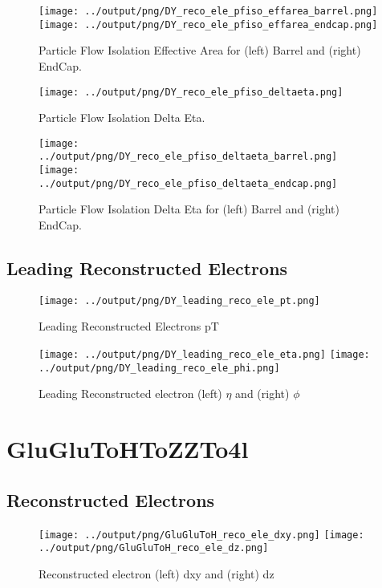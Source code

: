 \documentclass[11pt]{book}
\begin{document}
\begin{figure}[ht]
\centering
\texttt{[image: ../output/png/DY\_reco\_ele\_pfiso\_effarea\_barrel.png]}
\texttt{[image: ../output/png/DY\_reco\_ele\_pfiso\_effarea\_endcap.png]}
\caption{Particle Flow Isolation Effective Area for (left) Barrel and (right) EndCap.}
\label{fig:dy_reco_ele_pfiso_effarea_regions}
\end{figure}


\begin{figure}[ht]
\centering
\texttt{[image: ../output/png/DY\_reco\_ele\_pfiso\_deltaeta.png]}
\caption{Particle Flow Isolation Delta Eta.}
\label{fig:dy_reco_ele_pfiso_deltaeta}
\end{figure}

\begin{figure}[ht]
\centering
\texttt{[image: ../output/png/DY\_reco\_ele\_pfiso\_deltaeta\_barrel.png]}
\texttt{[image: ../output/png/DY\_reco\_ele\_pfiso\_deltaeta\_endcap.png]}
\caption{Particle Flow Isolation Delta Eta for (left) Barrel and (right) EndCap.}
\label{fig:dy_reco_ele_pfiso_deltaeta_regions}
\end{figure}
\clearpage


\section{Leading Reconstructed Electrons}

\begin{figure}[ht]
\centering
\texttt{[image: ../output/png/DY\_leading\_reco\_ele\_pt.png]}
\caption{Leading Reconstructed Electrons pT}
\label{fig:dy_leading_reco_ele_pt}
\end{figure}

\begin{figure}[ht]
\centering
\texttt{[image: ../output/png/DY\_leading\_reco\_ele\_eta.png]}
\texttt{[image: ../output/png/DY\_leading\_reco\_ele\_phi.png]}
\caption{Leading Reconstructed electron (left) $\eta$ and (right) $\phi$}
\label{fig:dy_leading_reco_ele_eta_phi}
\end{figure}
\clearpage

\chapter{GluGluToHToZZTo4l}
\section{Reconstructed Electrons}
\begin{figure}[ht]
\centering
\texttt{[image: ../output/png/GluGluToH\_reco\_ele\_dxy.png]}
\texttt{[image: ../output/png/GluGluToH\_reco\_ele\_dz.png]}
\caption{Reconstructed electron (left) dxy and (right) dz}
\label{fig:gluglu_reco_ele_dxy_dz}
\end{figure}
\end{document}
